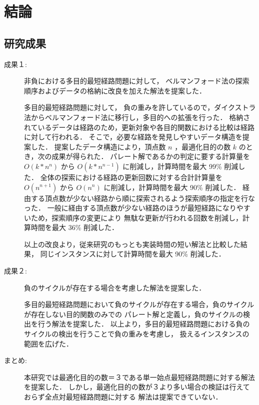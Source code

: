\documentclass[12pt]{optlab-bachelor}
\begin{document}
\chapter{結論}

\section{研究成果}

\begin{description}
  \item[成果１:]
  非負における多目的最短経路問題に対して，
  ベルマンフォード法の探索順序およびデータの格納に改良を加えた解法を提案した．

  多目的最短経路問題に対して，
  負の重みを許しているので，ダイクストラ法からベルマンフォード法に移行し，多目的への拡張を行った．
  格納されているデータは経路のため，更新対象や各目的関数における比較は経路に対して行われる．
  そこで，必要な経路を発見しやすいデータ構造を提案した．
  提案したデータ構造により，頂点数 $n$ ，最適化目的の数 $k$ のとき，次の成果が得られた．
  パレート解であるかの判定に要する計算量を $O(k*n^n)$ から $O(k*n^{n-1})$ に削減し，計算時間を最大 99\% 削減した．
  全体の探索における経路の更新回数に対する合計計算量を $O(n^{n+1})$ から $O(n^n)$ に削減し，計算時間を最大 90\% 削減した．
  経由する頂点数が少ない経路から順に探索されるよう探索順序の指定を行なった．
  一般に経由する頂点数が少ない経路のほうが最短経路になりやすいため，探索順序の変更により
  無駄な更新が行われる回数を削減し，計算時間を最大 36\% 削減した．

  以上の改良より，従来研究のもっとも実装時間の短い解法と比較した結果，
  同じインスタンスに対して計算時間を最大 90\% 削減した．
\end{description}

\begin{description}
  \item[成果２:]
  負のサイクルが存在する場合を考慮した解法を提案した．

  多目的最短経路問題において負のサイクルが存在する場合，負のサイクルが存在しない目的関数のみでの
  パレート解と定義し，負のサイクルの検出を行う解法を提案した．
  以上より，多目的最短経路問題における負のサイクルの検出を行うことで負の重みを考慮し，
  扱えるインスタンスの範囲を広げた．
\end{description}

\begin{description}
  \item[まとめ:]
  本研究では最適化目的の数＝３である単一始点最短経路問題に対する解法を提案した．
  しかし，最適化目的の数が３より多い場合の検証は行えておらず全点対最短経路問題に対する
  解法は提案できていない．
\end{description}
\end{document}
